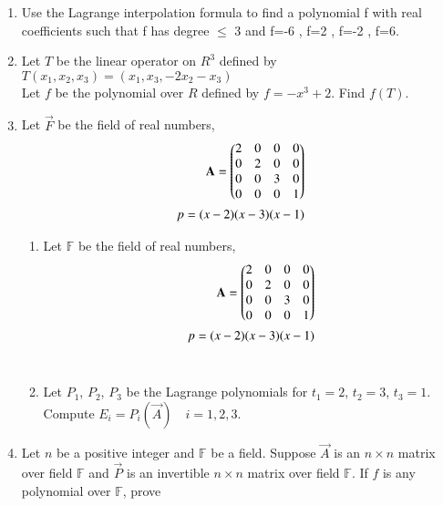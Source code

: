 \renewcommand{\theequation}{\theenumi}
\renewcommand{\thefigure}{\theenumi}
\begin{enumerate}[label=\thesubsection.\arabic*.,ref=\thesubsection.\theenumi]

\item Use the Lagrange interpolation formula to find a polynomial f with real coefficients such that f has degree $\leq$ 3 and f=-6 , f=2 , f=-2 , f=6.
%
\\
\solution

\item Let $T$ be the linear operator on $R^3$ defined by\\
$T(x_1,x_2,x_3)=(x_1,x_3,-2x_2-x_3)$\\
Let $f$ be the polynomial over $R$ defined by $f=-x^3+2$. Find $f(T)$.
%
\\
\solution

\item Let $\vec{F}$ be the field of real numbers, 
\begin{align}
\mathbf{A}=\begin{pmatrix}2&0&0&0\\0&2&0&0\\0&0&3&0\\0&0&0&1\end{pmatrix}\\
p= (x - 2)(x - 3)(x - 1) 
\end{align}
\begin{enumerate}
\item Let $\mathbb{F}$ be the field of real numbers,
\begin{align}
\mathbf{A}=\begin{pmatrix}2&0&0&0\\0&2&0&0\\0&0&3&0\\0&0&0&1\end{pmatrix}\\
p=(x-2)(x-3)(x-1)
\end{align}
%
\\
\solution

\item Let $P_1$, $P_2$, $P_3$ be the Lagrange polynomials for $t_1 = 2$, $t_2 = 3$, $t_3 = 1$. Compute $E_i = P_i(\vec{A})\quad i = 1, 2, 3$. 
%
\\
\solution

\end{enumerate}
\item Let $n$ be a positive integer and $\mathbb{F}$ be a field. Suppose $\vec{A}$ is an $n \times n$ matrix over field $\mathbb{F}$ and $\vec{P}$ is an invertible $n \times n$ matrix over field $\mathbb{F}$. If $f$ is any polynomial over $\mathbb{F}$, prove

\end{enumerate}
